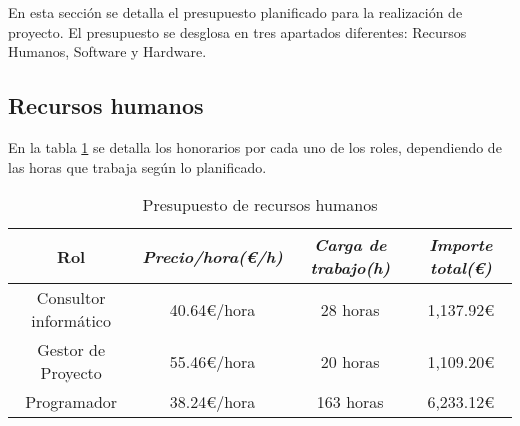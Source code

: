 En esta sección se detalla el presupuesto planificado para la realización de proyecto. El presupuesto se desglosa en tres apartados diferentes: Recursos Humanos, Software y Hardware.

\subsection{Recursos humanos}

En la tabla \ref{tab:budget-human} se detalla los honorarios por cada uno de los roles, dependiendo de las horas que trabaja según lo planificado.

\begin{table}[htp]
	\centering
	\caption{Presupuesto de recursos humanos}\label{tab:budget-human}
	\begin{tabular}{cccc}
		\toprule
    	\textbf{Rol} & \emph{Precio/hora(\euro/h)} & \emph{Carga de trabajo(h)} & \emph{Importe total(\euro)}\\
    	\midrule
		Consultor informático	&	40.64€/hora	&	28 horas	&	1,137.92€\\
		Gestor de Proyecto		&	55.46€/hora	&	20 horas	&	1,109.20€\\
		Programador				&	38.24€/hora	&	163 horas	&	6,233.12€\\
    	\bottomrule
    \end{tabular}
\end{table}